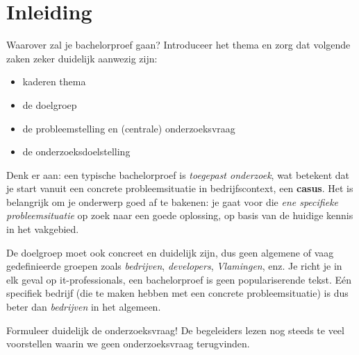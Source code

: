 


% 

\section{Inleiding}%
\label{sec:inleiding}

Waarover zal je bachelorproef gaan? Introduceer het thema en zorg dat volgende zaken zeker duidelijk aanwezig zijn:

\begin{itemize}
  \item kaderen thema
  \item de doelgroep
  \item de probleemstelling en (centrale) onderzoeksvraag
  \item de onderzoeksdoelstelling
\end{itemize}

Denk er aan: een typische bachelorproef is \textit{toegepast onderzoek}, wat betekent dat je start vanuit een concrete probleemsituatie in bedrijfscontext, een \textbf{casus}. Het is belangrijk om je onderwerp goed af te bakenen: je gaat voor die \textit{ene specifieke probleemsituatie} op zoek naar een goede oplossing, op basis van de huidige kennis in het vakgebied.

De doelgroep moet ook concreet en duidelijk zijn, dus geen algemene of vaag gedefinieerde groepen zoals \emph{bedrijven}, \emph{developers}, \emph{Vlamingen}, enz. Je richt je in elk geval op it-professionals, een bachelorproef is geen populariserende tekst. Eén specifiek bedrijf (die te maken hebben met een concrete probleemsituatie) is dus beter dan \emph{bedrijven} in het algemeen.

Formuleer duidelijk de onderzoeksvraag! De begeleiders lezen nog steeds te veel voorstellen waarin we geen onderzoeksvraag terugvinden.

